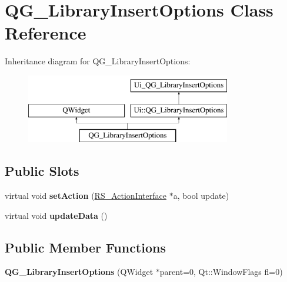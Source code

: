 \hypertarget{classQG__LibraryInsertOptions}{\section{Q\-G\-\_\-\-Library\-Insert\-Options Class Reference}
\label{classQG__LibraryInsertOptions}
}
Inheritance diagram for Q\-G\-\_\-\-Library\-Insert\-Options\-:\begin{figure}[H]
\begin{center}
\leavevmode
\includegraphics[height=3.000000cm]{classQG__LibraryInsertOptions}
\end{center}
\end{figure}
\subsection*{Public Slots}
\begin{DoxyCompactItemize}
\item 
\hypertarget{classQG__LibraryInsertOptions_a5f7835406261b4efc5e59b56c19e7aaa}{virtual void {\bfseries set\-Action} (\hyperlink{classRS__ActionInterface}{R\-S\-\_\-\-Action\-Interface} $\ast$a, bool update)}\label{classQG__LibraryInsertOptions_a5f7835406261b4efc5e59b56c19e7aaa}

\item 
\hypertarget{classQG__LibraryInsertOptions_af998e537ccd4773183ae3e1a43fd1555}{virtual void {\bfseries update\-Data} ()}\label{classQG__LibraryInsertOptions_af998e537ccd4773183ae3e1a43fd1555}

\end{DoxyCompactItemize}
\subsection*{Public Member Functions}
\begin{DoxyCompactItemize}
\item 
\hypertarget{classQG__LibraryInsertOptions_adbd2b57baacf12b579f5af52fa1504e9}{{\bfseries Q\-G\-\_\-\-Library\-Insert\-Options} (Q\-Widget $\ast$parent=0, Qt\-::\-Window\-Flags fl=0)}\label{classQG__LibraryInsertOptions_adbd2b57baacf12b579f5af52fa1504e9}

\end{DoxyCompactItemize}
